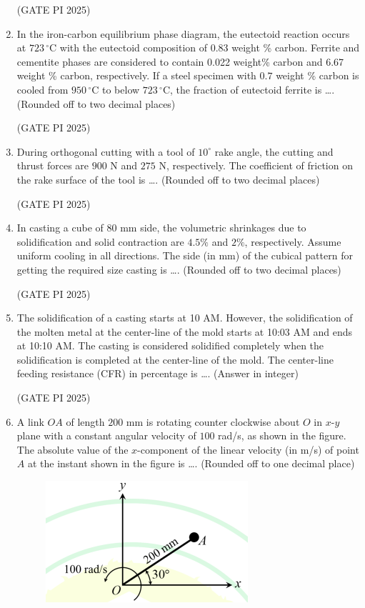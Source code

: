 \documentclass[journal,12pt,onecolumn]{IEEEtran}
\theoremstyle{remark}
\begin{document}
\begin{enumerate}
\hfill (GATE PI 2025)

\item In the iron-carbon equilibrium phase diagram, the eutectoid reaction occurs at $723\,^\circ\mathrm{C}$ with the eutectoid composition of $0.83$ weight \% carbon. Ferrite and cementite phases are considered to contain 0.022 weight\% carbon and 6.67 weight \% carbon, respectively. If a steel specimen with $0.7$ weight \% carbon is cooled from $950\,^\circ\mathrm{C}$ to below $723\,^\circ\mathrm{C}$, the fraction of eutectoid ferrite is \dots. (Rounded off to two decimal places)

\hfill (GATE PI 2025)

\item During orthogonal cutting with a tool of $10^\circ$ rake angle, the cutting and thrust forces are $900$ N and $275$ N, respectively. The coefficient of friction on the rake surface of the tool is \dots. (Rounded off to two decimal places)

\hfill (GATE PI 2025)

\item In casting a cube of $80$ mm side, the volumetric shrinkages due to solidification and solid contraction are $4.5\%$ and $2\%$, respectively. Assume uniform cooling in all directions. The side (in mm) of the cubical pattern for getting the required size casting is \dots. (Rounded off to two decimal places)

\hfill (GATE PI 2025)

\item The solidification of a casting starts at 10 AM. However, the solidification of the molten metal at the center-line of the mold starts at 10:03 AM and ends at 10:10 AM. The casting is considered solidified completely when the solidification is completed at the center-line of the mold. The center-line feeding resistance (CFR) in percentage is \dots. (Answer in integer)

\hfill (GATE PI 2025)

\item A link $OA$ of length $200$ mm is rotating counter clockwise about $O$ in $x$-$y$ plane with a constant angular velocity of $100$ rad/s, as shown in the figure. The absolute value of the $x$-component of the linear velocity (in m/s) of point $A$ at the instant shown in the figure is \dots. (Rounded off to one decimal place)

\begin{figure}[H]
\centering
\includegraphics[width=0.5\columnwidth]{fig6.png}
\caption{}
\end{figure}



\end{enumerate}
\end{document}
